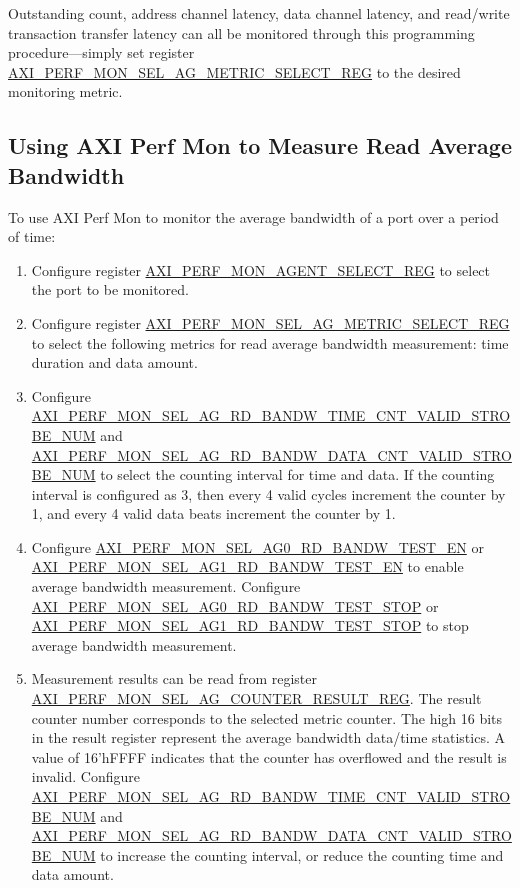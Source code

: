 \documentclass[main\_\_EN.tex]{subfiles}
\begin{document}
Outstanding count, address channel latency, data channel latency, and read/write transaction transfer latency can all be monitored through this programming procedure—simply set register \hyperref[regdesc:AXIPERFMONSELAGNMETRICSELECTMREG]{AXI\_PERF\_MON\_SEL\_AG\_METRIC\_SELECT\_REG} to the desired monitoring metric.

\subsection{Using AXI Perf Mon to Measure Read Average Bandwidth}
To use AXI Perf Mon to monitor the average bandwidth of a port over a period of time:
\begin{enumerate}
    \item Configure register \hyperref[regdesc:AXIPERFMONAGENTSELECTREG]{AXI\_PERF\_MON\_AGENT\_SELECT\_REG} to select the port to be monitored.
    \item Configure register \hyperref[regdesc:AXIPERFMONSELAGNMETRICSELECTMREG]{AXI\_PERF\_MON\_SEL\_AG\_METRIC\_SELECT\_REG} to select the following metrics for read average bandwidth measurement: time duration and data amount.
    \item Configure \hyperref[fielddesc:AXIPERFMONSELAGNRDBANDWTIMECNTVALIDSTROBENUM]{AXI\_PERF\_MON\_SEL\_AG\_RD\_BANDW\_TIME\_CNT\_VALID\_STROBE\_NUM} and \hyperref[fielddesc:AXIPERFMONSELAGNRDBANDWDATACNTVALIDSTROBENUM]{AXI\_PERF\_MON\_SEL\_AG\_RD\_BANDW\_DATA\_CNT\_VALID\_STROBE\_NUM} to select the counting interval for time and data. If the counting interval is configured as 3, then every 4 valid cycles increment the counter by 1, and every 4 valid data beats increment the counter by 1.
    \item Configure \hyperref[fielddesc:AXIPERFMONSELAG0RDBANDWTESTEN]{AXI\_PERF\_MON\_SEL\_AG0\_RD\_BANDW\_TEST\_EN} or \hyperref[fielddesc:AXIPERFMONSELAG1RDBANDWTESTEN]{AXI\_PERF\_MON\_SEL\_AG1\_RD\_BANDW\_TEST\_EN} to enable average bandwidth measurement. Configure \hyperref[fielddesc:AXIPERFMONSELAG0RDBANDWTESTSTOP]{AXI\_PERF\_MON\_SEL\_AG0\_RD\_BANDW\_TEST\_STOP} or \hyperref[fielddesc:AXIPERFMONSELAG1RDBANDWTESTSTOP]{AXI\_PERF\_MON\_SEL\_AG1\_RD\_BANDW\_TEST\_STOP} to stop average bandwidth measurement.
    \item Measurement results can be read from register \hyperref[regdesc:AXIPERFMONSELAGNCOUNTERMREG]{AXI\_PERF\_MON\_SEL\_AG\_COUNTER\_RESULT\_REG}. The result counter number corresponds to the selected metric counter. The high 16 bits in the result register represent the average bandwidth data/time statistics. A value of 16'hFFFF indicates that the counter has overflowed and the result is invalid. Configure \hyperref[fielddesc:AXIPERFMONSELAGNRDBANDWTIMECNTVALIDSTROBENUM]{AXI\_PERF\_MON\_SEL\_AG\_RD\_BANDW\_TIME\_CNT\_VALID\_STROBE\_NUM} and \hyperref[fielddesc:AXIPERFMONSELAGNRDBANDWDATACNTVALIDSTROBENUM]{AXI\_PERF\_MON\_SEL\_AG\_RD\_BANDW\_DATA\_CNT\_VALID\_STROBE\_NUM} to increase the counting interval, or reduce the counting time and data amount.
\end{enumerate}
\end{document}
